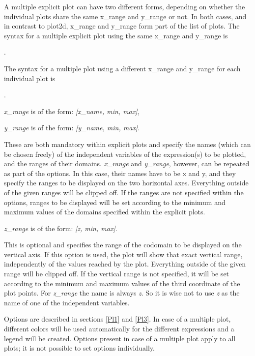 \documentclass[../Maxima_Workbook.tex]{subfiles}
\begin{document}
\lz A multiple explicit plot can have two different forms, depending on whether the individual plots share the same x\_range and y\_range or not. In both cases, and in contrast to plot2d, x\_range and y\_range form part of the list of plots. The syntax for a multiple explicit plot using the same x\_range and y\_range is

\lz {}.

\lz The syntax for a multiple plot using a different x\_range and y\_range for each individual plot is

\lz {}.

\lzz \emph{x\_range} is of the form: \emph{[x\_name, min, max]},

\emph{y\_range} is of the form: \emph{[y\_name, min, max]}. 

\lz These are both mandatory within explicit plots and specify the names (which can be chosen freely) of the independent variables of the expression(s) to be plotted, and the ranges of their domains. \emph{x\_range} and \emph{y\_range}, however, can be repeated as part of the options. In this case, their names have to be x and y, and they specify the ranges to be displayed on the two horizontal axes. Everything outside of the given ranges will be clipped off. If the ranges are not specified within the options, ranges to be displayed will be set according to the minimum and maximum values of the domains specified within the explicit plots. 

\lzz \emph{z\_range} is of the form: \emph{[z, min, max]}. 

\lz This is optional and specifies the range of the codomain to be displayed on the vertical axis. If this option is used, the plot will show that exact vertical range, independently of the values reached by the plot. Everything outside of the given range will be clipped off. If the vertical range is not specified, it will be set according to the minimum and maximum values of the third coordinate of the plot points. For \emph{z\_range} the name is always \emph{z}. So it is wise not to use \emph{z} as the name of one of the independent variables. 

\lz Options are described in sections \ref{Pl1} and \ref{Pl3}. In case of a multiple plot, different colors will be used automatically for the different expressions and a legend will be created. Options present in case of a multiple plot apply to all plots; it is not possible to set options individually.
\end{document}
